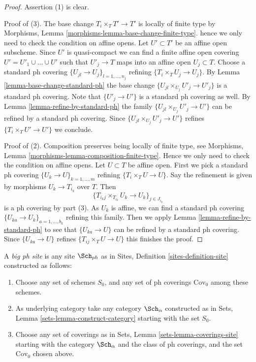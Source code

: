 \begin{proof}
Assertion (1) is clear.

\medskip\noindent
Proof of (3). The base change $T_i \times_T T' \to T'$ is
locally of finite type by
Morphisms, Lemma \ref{morphisms-lemma-base-change-finite-type}.
hence we only need to check the condition on affine opens.
Let $U' \subset T'$ be an affine open subscheme.
Since $U'$ is quasi-compact we can find a finite affine open
covering $U' = U'_1 \cup \ldots \cup U'$ such that
$U'_j \to T$ maps into an affine open $U_j \subset T$.
Choose a standard ph covering $\{U_{jl} \to U_j\}_{l = 1, \ldots, n_j}$
refining $\{T_i \times_T U_j \to U_j\}$.
By Lemma \ref{lemma-base-change-standard-ph}
the base change $\{U_{jl} \times_{U_j} U'_j \to U'_j\}$
is a standard ph covering. Note that $\{U'_j \to U'\}$
is a standard ph covering as well.
By Lemma \ref{lemma-refine-by-standard-ph} 
the family $\{U_{jl} \times_{U_j} U'_j \to U'\}$
can be refined by a standard ph covering. Since
$\{U_{jl} \times_{U_j} U'_j \to U'\}$ refines $\{T_i \times_T U' \to U'\}$
we conclude.

\medskip\noindent
Proof of (2). Composition preserves being locally of finite type,
see Morphisms, Lemma \ref{morphisms-lemma-composition-finite-type}.
Hence we only need to check the condition on affine opens.
Let $U \subset T$ be affine open. First we pick a standard ph covering
$\{U_k \to U\}_{k = 1, \ldots, m}$ refining
$\{T_i \times_T U \to U\}$.
Say the refinement is given by morphisms $U_k \to T_{i_k}$ over $T$.
Then
$$
\{T_{i_kj} \times_{T_{i_k}} U_k \to U_k\}_{j \in J_{i_k}}
$$
is a ph covering by part (3). As $U_k$ is affine,
we can find a standard ph covering
$\{U_{ka} \to U_k\}_{a = 1, \ldots, b_k}$ refining this family.
Then we apply Lemma \ref{lemma-refine-by-standard-ph}
to see that $\{U_{ka} \to U\}$ can be refined by a
standard ph covering. Since $\{U_{ka} \to U\}$
refines $\{T_{ij} \times_T U \to U\}$ this finishes the proof.
\end{proof}

\begin{definition}
\label{definition-big-ph-site}
A {\it big ph site} is any site $\Sch_{ph}$ as in
Sites, Definition \ref{sites-definition-site} constructed as follows:
\begin{enumerate}
\item Choose any set of schemes $S_0$, and any set of ph coverings
$\text{Cov}_0$ among these schemes.
\item As underlying category take any category $\Sch_\alpha$
constructed as in Sets, Lemma \ref{sets-lemma-construct-category}
starting with the set $S_0$.
\item Choose any set of coverings as in
Sets, Lemma \ref{sets-lemma-coverings-site} starting with the
category $\Sch_\alpha$ and the class of ph coverings,
and the set $\text{Cov}_0$ chosen above.
\end{enumerate}
\end{definition}

